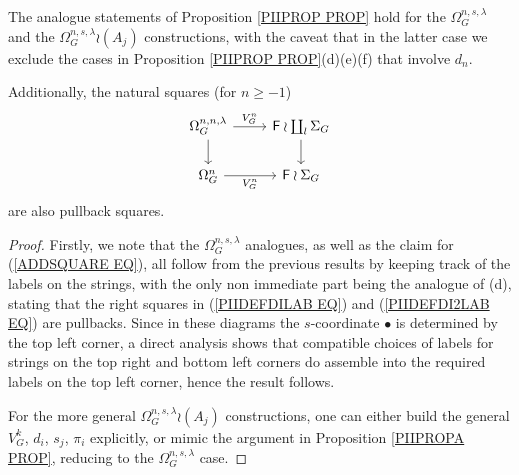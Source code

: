 \documentclass[a4paper,10pt]{article}%
\begin{document}
\begin{proposition}\label{PIIPROPAB PROP}
The analogue statements of Proposition \ref{PIIPROP PROP}
hold for the $\Omega_{G}^{n,s,\lambda}$
and the $\Omega_{G}^{n,s,\lambda} \wr (A_j)$
constructions, 
with the caveat that in the latter case we
exclude the cases in Proposition \ref{PIIPROP PROP}(d)(e)(f)
that involve $d_n$.

Additionally, the natural squares  (for $n \geq -1$)
\begin{equation}\label{ADDSQUARE EQ}
\begin{tikzcd}
	\Omega_{G}^{n,n,\lambda}
	\ar{r}{V_{G}^{n}} \ar{d}& 
	\Fin \wr \coprod_l \Sigma_G \ar{d}
\\
	\Omega_{G}^{n} \ar{r}[swap]{V_{G}^{n}} &
	\Fin \wr \Sigma_G
\end{tikzcd}
\end{equation}
are also pullback squares.
\end{proposition}

\begin{proof}
	Firstly, we note that the $\Omega_{G}^{n,s,\lambda}$
	analogues, as well as the claim for (\ref{ADDSQUARE EQ}), all follow from the previous results
	by keeping track of the labels on the strings, 
	with the only non immediate part
	being the analogue of (d), stating that the right squares in 
	(\ref{PIIDEFDILAB EQ}) and
	(\ref{PIIDEFDI2LAB EQ}) are pullbacks. Since in these diagrams the $s$-coordinate $\bullet$ is determined by the top left corner, a direct analysis shows that compatible choices of labels for strings on the top right and bottom left corners do assemble into the required labels on the top left corner, hence the result follows.
		
	For the more general $\Omega_{G}^{n,s,\lambda} \wr (A_j)$ constructions, one can either build the
	general $V_G^k$, $d_i$, $s_j$, $\pi_i$ 
	explicitly, or mimic the argument in Proposition \ref{PIIPROPA PROP}, reducing to the 
	$\Omega_{G}^{n,s,\lambda}$ case.
\end{proof}
\end{document}
